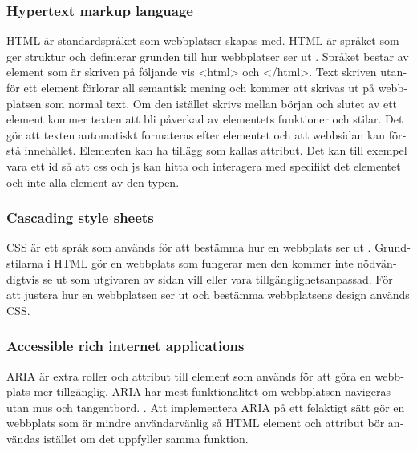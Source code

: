 \documentclass[11p]{article}
\begin{document}
\begin{otherlanguage}{swedish}
    \subsubsection{Hypertext markup language}
    HTML är standardspråket som webbplatser skapas med.
    HTML är språket som ger struktur och definierar grunden till hur webbplatser ser ut \parencite{HTML}.
    Språket bestar av element som är skriven på följande vis <html> och </html>.
    Text skriven utanför ett element förlorar all semantisk mening och kommer att skrivas ut på webbplatsen som normal text.
    Om den istället skrivs mellan början och slutet av ett element kommer texten att bli påverkad av elementets funktioner och stilar.
    Det gör att texten automatiskt formateras efter elementet och att webbsidan kan förstå innehållet.
    Elementen kan ha tillägg som kallas attribut.
    Det kan till exempel vara ett id så att css och js kan hitta och interagera med specifikt det elementet och inte alla element av den typen.


    \subsubsection{Cascading style sheets}
    CSS är ett språk som används för att bestämma hur en webbplats ser ut \parencite{CSS}.
    Grundstilarna i HTML gör en webbplats som fungerar men den kommer inte nödvändigtvis se ut som utgivaren av sidan vill eller vara tillgänglighetsanpassad.
    För att justera hur en webbplatsen ser ut och bestämma webbplatsens design används CSS.

    \subsubsection{Accessible rich internet applications}
    ARIA är extra roller och attribut till element som används för att göra en webbplats mer tillgänglig.
    ARIA har mest funktionalitet om webbplatsen navigeras utan mus och tangentbord. \parencite{ARIA}.
    Att implementera ARIA på ett felaktigt sätt gör en webbplats som är mindre användarvänlig så HTML element och attribut bör användas istället om det uppfyller samma funktion.
    

\end{otherlanguage}
\end{document}

